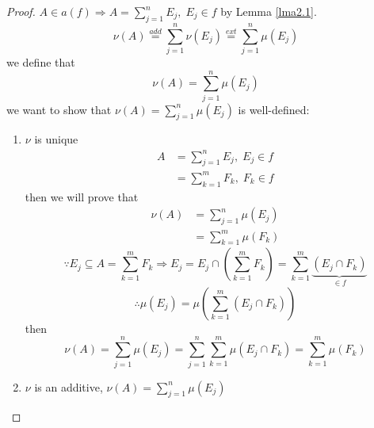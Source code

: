 \begin{proof}
	$ A \in a(f) \Rightarrow A = \sum\limits_{j = 1}^n {{E_j}} ,\;{E_j} \in f $ by Lemma  \ref{lma2.1}.
	\begin{equation}
	\nu \left( A \right) \stackrel{add}{=} \sum\limits_{j = 1}^n {\nu \left( {{E_j}} \right)}  \stackrel{ext}{=} \sum\limits_{j = 1}^n {\mu \left( {{E_j}} \right)} 
	\end{equation}
	we define that
	\begin{equation}
	\nu \left( A \right) = \sum\limits_{j = 1}^n {\mu \left( {{E_j}} \right)} 
	\label{eq3.19}
	\end{equation}
	we want to show that $\nu \left( A \right) = \sum\limits_{j = 1}^n {\mu \left( {{E_j}} \right)} $ is well-defined:
	\begin{enumerate}
		\item $ \nu $ is unique
		\begin{equation}
		\begin{split}
		A & = \sum\limits_{j = 1}^n {{E_j}} ,\;{E_j} \in f\\
		  & = \sum\limits_{k = 1}^m {{F_k}} ,\;{F_k} \in f
		\end{split}
		\end{equation}
		then we will prove that 
		\begin{equation}
		\begin{split}
		\nu \left( A \right) & = \sum\limits_{j = 1}^n {\mu \left( {{E_j}} \right)} \\
							 & = \sum\limits_{k = 1}^m {\mu \left( {{F_k}} \right)} 
		\end{split}
		\end{equation}
		\begin{equation}
		\because {E_j} \subseteq A = \sum\limits_{k = 1}^m {F{}_k}  \Rightarrow {E_j} = {E_j} \cap \left( {\sum\limits_{k = 1}^m {F{}_k} } \right) = \sum\limits_{k = 1}^m {\underbrace {\left( {{E_j} \cap {F_k}} \right)}_{ \in f}} 
		\end{equation}
		\begin{equation}
		\therefore \mu \left( {{E_j}} \right) = \mu \left( {\sum\limits_{k = 1}^m {\left( {{E_j} \cap {F_k}} \right)} } \right)
		\end{equation}
		then 
		\begin{equation}
		\nu \left( A \right) = \sum\limits_{j = 1}^n {\mu \left( {{E_j}} \right)}  = \sum\limits_{j = 1}^n {\sum\limits_{k = 1}^m {\mu \left( {{E_j} \cap {F_k}} \right) = } } \sum\limits_{k = 1}^m {\mu \left( {{F_k}} \right)} 
		\end{equation}
		\item $ \nu $ is an additive, $\nu \left( A \right) = \sum\limits_{j = 1}^n {\mu \left( {{E_j}} \right)}  $
		

\end{enumerate}
\end{proof}

